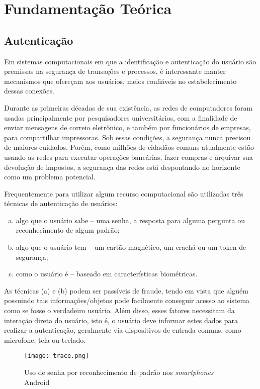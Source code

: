 \chapter{Fundamentação Teórica}
\section{Autenticação}
Em sistemas computacionais em que a identificação e autenticação do usuário são premissas na segurança de transações e processos, é interessante manter mecanismos que ofereçam aos usuários, meios confiáveis no estabelecimento dessas conexões.
\begin{citacao}
Durante as primeiras décadas de sua existência, as redes de computadores foram usadas principalmente por pesquisadores universitários, com a finalidade de enviar mensagens de correio eletrônico, e também por funcionários de empresas, para compartilhar impressoras. Sob essas condições, a segurança nunca precisou de maiores cuidados. Porém, como milhões de cidadãos comuns atualmente estão usando as redes para executar operações bancárias, fazer compras e arquivar sua devolução de impostos, a segurança das redes está despontando no horizonte como um problema potencial.\cite{tanenbaum2003redes}
\end{citacao}
Frequentemente para utilizar algum recurso computacional são utilizadas três técnicas de autenticação de usuários:
\begin{enumerate}[(a)]
\item algo que o usuário sabe – uma senha, a resposta para alguma pergunta ou reconhecimento de algum padrão;
\item algo que o usuário tem – um cartão magnético, um crachá ou um token de segurança;
\item como o usuário é – baseado em características biométricas.
\end{enumerate}

As técnicas (a) e (b) podem ser passíveis de fraude, tendo em vista que alguém possuindo tais informações/objetos pode facilmente conseguir acesso ao sistema como se fosse o verdadeiro usuário. Além disso, esses fatores necessitam da interação direta do usuário, isto é, o usuário deve informar estes dados para realizar a autenticação, geralmente via dispositivos de entrada comuns, como microfone, tela ou teclado.

\begin{figure}[!htb]
	\centering
	\texttt{[image: trace.png]} %
	\small
	\caption[Uso de senha por reconhecimento de padrão]{Uso de senha por reconhecimento de padrão nos \textit{smartphones} Android}
	\label{fig:trace}
\end{figure}

